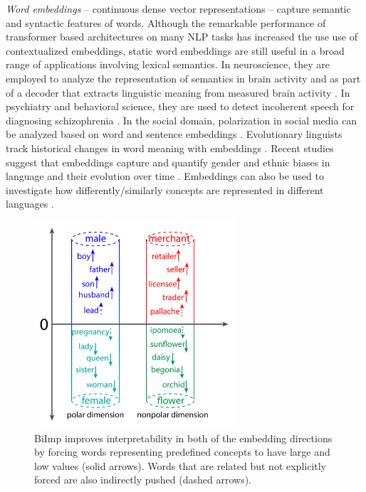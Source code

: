 \documentclass[11pt,a4paper]{article}
\def\proposedmethod{BiImp}
\begin{document}
\emph{Word embeddings} \citep{mikolov13word2vec_a,mikolov13word2vec_b,pennington14glove,bojanowski2017enriching}
-- continuous dense vector representations --
capture semantic and syntactic features
of words. 
Although the remarkable performance of transformer based
architectures
\citep{vaswani17transformers,devlin19BERT,Radford19GPT2} on
many NLP tasks has increased the use use of contextualized embeddings, static word embeddings are still useful in a broad range of applications involving lexical semantics. 
In neuroscience, they are employed to analyze the representation of semantics in brain
activity
\citep{ruan16brainActivity,huth16semanticMaps,zhang20connecting} and as part of a
decoder that extracts linguistic meaning from measured brain
activity \citep{pereira18universalDecoder}. 
In psychiatry and behavioral science, they are used to detect incoherent speech for diagnosing schizophrenia
\citep{iter2018automatic}.
In the social domain, polarization in social media \citep{demszky19analyzing} can be analyzed based on word and sentence embeddings \citep{demszky19analyzing}. 
Evolutionary linguists track historical changes in word meaning with embeddings \citep{hamilton16diachronic,kutuzov18diachronic}. 
Recent studies suggest that embeddings  capture and quantify gender and ethnic biases in language \citep{bolukbasi16debiasing,garg18gender100years,caliskan17humanLikeBiases} and their evolution over time \citep{agarwal2019word}. 
Embeddings can also be used to investigate how differently/similarly concepts are represented in different languages
\citep{senel17crossLingual,senel18atlas}.

\begin{figure}
    \centering
    \includegraphics[width=7.5cm]{Figures/impart_figure_real.pdf}
    \caption{\proposedmethod{} improves interpretability in both of the embedding directions by forcing words representing predefined concepts to have large and low values (solid arrows). Words that are related but not explicitly forced are also indirectly pushed (dashed arrows).}
    \label{fig:bi_imp}
\end{figure}
\end{document}

